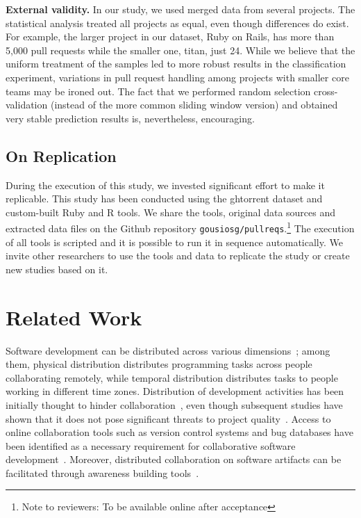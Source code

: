 \documentclass{acm_proc_article-sp}
\begin{document}
\textbf{External validity.}
In our study, we used merged data from several projects. The statistical
analysis treated all projects as equal, even though differences do exist.
For example, the larger project in our dataset, Ruby on Rails, 
has more than 5,000 pull requests while the smaller one, \textsf{titan}, just 24.
While we believe that the uniform treatment of the samples led to more robust
results in the classification experiment, variations in pull request
handling among projects with smaller core teams may be ironed out.
The fact that we performed random selection cross-validation (instead
of the more common sliding window version) and obtained very stable prediction
results is, nevertheless, encouraging.

\subsection{On Replication}
During the execution of this study, we invested significant effort to make it
replicable. This study has been conducted using the {\sc ght}orrent dataset and
custom-built Ruby and R tools. We share the tools, original data sources and
extracted data files on the Github repository
\texttt{gousiosg/pullreqs}.\footnote{Note to reviewers: To be available online after acceptance} The
execution of all tools is scripted and it is possible to run it in sequence
automatically. We invite other researchers to use the tools and data to
replicate the study or create new studies based on it.

\section{Related Work}

Software development can be distributed across various
di\-men\-sions~\cite{Gumm06}; among them, physical distribution distributes
programming tasks across people collaborating remotely, while temporal
distribution distributes tasks to people working in different time zones.
Distribution of development activities has been initially thought to hinder
collaboration~\cite{Herbs99, Batti01}, even though subsequent studies have
shown that it does not pose significant threats to project
quality~\cite{Spine06, Nguye08, Bird09a}. Access to online collaboration tools
such as version control systems and bug databases have been identified as a necessary
requirement for collaborative software development~\cite{Catal06}. Moreover, distributed collaboration on software artifacts can be
facilitated through awareness building tools~\cite{Dabbi12, Lanza10}. 
\end{document}
